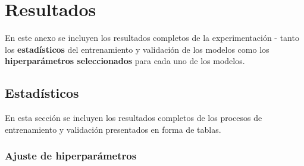 \chapter{Resultados}

En este anexo se incluyen los resultados completos de la experimentación - tanto los \textbf{estadísticos} del entrenamiento y validación de los modelos como los \textbf{hiperparámetros seleccionados} para cada uno de los modelos.

\section{Estadísticos}

En esta sección se incluyen los resultados completos de los procesos de entrenamiento y validación presentados en forma de tablas.

\subsection{Ajuste de hiperparámetros}

